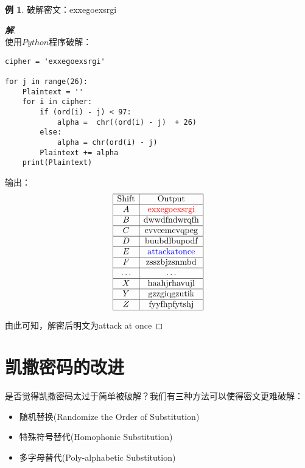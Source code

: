 \documentclass{article}
\theoremstyle{definition}
\newtheorem{example}{\indent 例}
\newenvironment{solution}{\begin{proof}[\indent\bf 解]}{\end{proof}}
\begin{document}
\begin{example}
破解密文：exxegoexsrgi
\begin{solution}
~\\

使用$Python$程序破解：
\begin{lstlisting}
cipher = 'exxegoexsrgi'

for j in range(26):
    Plaintext = ''
    for i in cipher:
        if (ord(i) - j) < 97:
            alpha =  chr((ord(i) - j)  + 26)
        else:
            alpha = chr(ord(i) - j)
        Plaintext += alpha
    print(Plaintext)
\end{lstlisting}

输出：
$$
\begin{array}{|c|c|}
\hline \text {Shift} & \text {Output} \\
\hline A & \text {\color{red} exxegoexsrgi} \\
\hline B & \text {dwwdfndwrqfh} \\
\hline C & \text {cvvcemcvqpeg} \\
\hline D & \text {buubdlbupodf} \\
\hline E & \text {\color{blue} attackatonce} \\
\hline F & \text {zsszbjzsnmbd} \\
\hline \ldots & \ldots \\
\hline X & \text {haahjrhavujl} \\
\hline Y & \text {gzzgiqgzutik} \\
\hline Z & \text {fyyfhpfytshj} \\
\hline
\end{array}
$$

由此可知，解密后明文为attack at once

\end{solution}
\end{example}


\section{凯撒密码的改进}
是否觉得凯撒密码太过于简单被破解？我们有三种方法可以使得密文更难破解：
\begin{itemize}
\end{itemize}
\begin{itemize}
\item 随机替换(Randomize the Order of Substitution)
\item 特殊符号替代(Homophonic Substitution)
\item 多字母替代(Poly-alphabetic Substitution)
\end{itemize}
\end{document}

